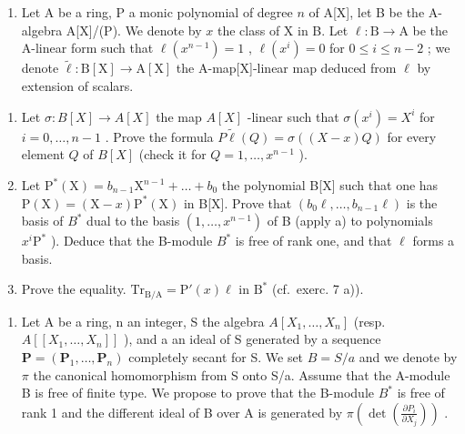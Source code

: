 \begin{enumerate}
\def\labelenumi{\arabic{enumi})}
\setcounter{enumi}{7}
\tightlist
\item
  Let A be a ring, P a monic polynomial of degree \(n\) of A{[}X{]}, let B be the A-algebra A{[}X{]}/(P). We denote by \(x\) the class of X in B. Let \(\ell: \mathrm{B} \to \mathrm{A}\) be the A-linear form such that \(\ell(x^{n-1}) = 1\) , \(\ell(x^i) = 0\) for \(0 \leqslant i \leqslant n-2\) ; we denote \(\tilde{\ell}: \mathrm{B}[\mathrm{X}] \to \mathrm{A}[\mathrm{X}]\) the A-map{[}X{]}-linear map deduced from \(\ell\) by extension of scalars.
\end{enumerate}

\begin{enumerate}
\def\labelenumi{\alph{enumi})}
\item
  Let \(\sigma : B[X] \to A[X]\) the map \(A[X]\) -linear such that \(\sigma(x^i) = X^i\) for \(i = 0, \ldots, n - 1\) . Prove the formula \(P\tilde{\ell}(Q) = \sigma((X - x)Q)\) for every element \(Q\) of \(B[X]\) (check it for \(Q = 1, \ldots, x^{n-1}\) ).
\item
  Let \(\mathrm{P}^{*}(\mathrm{X}) = b_{n-1}\mathrm{X}^{n-1} + \ldots + b_{0}\) the polynomial B{[}X{]} such that one has \(\mathrm{P}(\mathrm{X}) = (\mathrm{X} - x)\mathrm{P}^{*}(\mathrm{X})\) in B{[}X{]}. Prove that \((b_{0}\ell, \ldots, b_{n-1}\ell)\) is the basis of \(B^{*}\) dual to the basis \((1, \ldots, x^{n-1})\) of B (apply a) to polynomials \(x^{i}\mathrm{P}^{*}\) ). Deduce that the B-module \(B^{*}\) is free of rank one, and that \(\ell\) forms a basis.
\item
  Prove the equality. \(\mathrm{Tr}_{\mathrm{B / A}} = \mathrm{P}'(x)\ell\) in \(\mathrm{B}^*\) (cf.~exerc. 7 a)).
\end{enumerate}

\begin{enumerate}
\def\labelenumi{\arabic{enumi})}
\setcounter{enumi}{8}
\tightlist
\item
  Let A be a ring, n an integer, S the algebra \(A[X_{1},\ldots,X_{n}]\) (resp. \(A[[X_{1},\ldots,X_{n}]]\) ), and a an ideal of S generated by a sequence \(\mathbf{P}=(\mathbf{P}_{1},\ldots,\mathbf{P}_{n})\) completely secant for S. We set \(B=S/a\) and we denote by \(\pi\) the canonical homomorphism from S onto S/a. Assume that the A-module B is free of finite type. We propose to prove that the B-module \(B^{*}\) is free of rank 1 and the different ideal of B over A is generated by \(\pi(\det(\frac{\partial P_{i}}{\partial X_{j}}))\) .
\end{enumerate}

